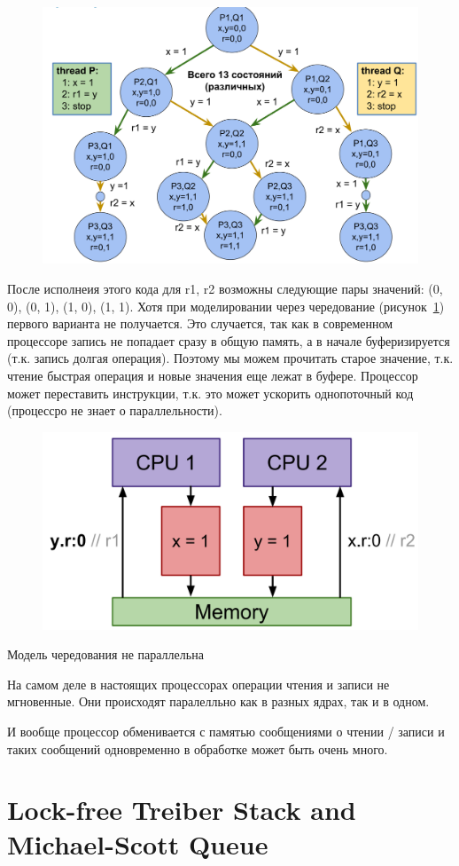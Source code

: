 \documentclass[10pt,a4paper,oneside,titlepage]{article}
\theoremstyle{plain}
\theoremstyle{defenition}
\begin{document}
\begin{figure}[h!]
	\centering
	\includegraphics[width=0.5\linewidth]{pictures/Model1}
	\caption{}
	\label{fig:model1}
\end{figure}


После исполнеия этого кода для r1, r2 возможны следующие пары значений: (0, 0), (0, 1), (1, 0), (1, 1). Хотя при моделировании через чередование (рисунок~\ref{fig:model1}) первого варианта не получается. Это случается, так как в современном процессоре запись не попадает сразу в общую память, а в начале буферизируется (т.к. запись долгая операция). Поэтому мы можем прочитать старое значение, т.к. чтение быстрая операция и новые значения еще лежат в буфере. Процессор может переставить инструкции, т.к. это может ускорить однопоточный код (процессро не знает о параллельности).

\begin{figure}[h!]
	\centering
	\includegraphics[width=0.4\linewidth]{pictures/Memory}
	\caption{}
	\label{fig:memory}
\end{figure}

Модель чередования не параллельна

На самом деле в настоящих процессорах операции чтения и записи не мгновенные. Они происходят паралелльно как в разных ядрах, так и в одном.

И вообще процессор обменивается с памятью сообщениями о чтении / записи и таких сообщений одновременно в обработке может быть очень много.

\section{Lock-free Treiber Stack and Michael-Scott Queue}
\end{document}
